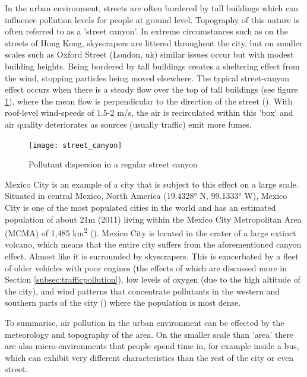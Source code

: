 In the urban environment, streets are often bordered by tall buildings which can influence pollution levels for people at ground level. Topography of this nature is often referred to as a 'street canyon'. In extreme circumstances such as on the streets of Hong Kong, skyscrapers are littered throughout the city, but on smaller scales such as Oxford Street (London, \gls{uk}) similar issues occur but with modest building heights. Being bordered by tall buildings creates a sheltering effect from the wind, stopping particles being moved elsewhere. The typical street-canyon effect occurs when there is a steady flow over the top of tall buildings (see figure \ref{fig:street_canyon}), where the mean flow is perpendicular to the direction of the street (\cite{Britter2003}). With roof-level wind-speeds of 1.5-2 m/s, the air is recirculated within this 'box' and air quality deteriorates as sources (usually traffic) emit more fumes.

\begin{figure}[H]
\centering
\texttt{[image: street\_canyon]}
\caption{Pollutant dispersion in a regular street canyon}
\label{fig:street_canyon}
\end{figure}

Mexico City is an example of a city that is subject to this effect on a large scale. Situated in central Mexico, North America (19.4328° N, 99.1333° W), Mexico City is one of the most populated cities in the world and has an estimated population of about 21m (2011) living within the Mexico City Metropolitan Area (MCMA) of 1,485 km\textsuperscript{2} (\cite{TheUnitedNationsStatisticsDivision2013}). Mexico City is located in the crater of a large extinct volcano, which means that the entire city suffers from the aforementioned canyon effect. Almost like it is surrounded by skyscrapers. This is exacerbated by a fleet of older vehicles with poor engines (the effects of which are discussed more in Section \ref{subsec:trafficpollution}), low levels of oxygen (due to the high altitude of the city), and wind patterns that concentrate pollutants in the western and southern parts of the city (\cite{Garza1996}) where the population is most dense.

To summarise, air pollution in the urban environment can be effected by the meteorology and topography of the area. On the smaller scale than 'area' there are also micro-environments that people spend time in, for example inside a bus, which can exhibit very different characteristics than the rest of the city or even street.

